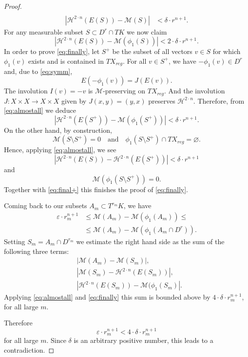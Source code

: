 \documentclass[12pt,leqno,intlimits]{amsart}
\numberwithin{equation}{section}
\theoremstyle{definition}
\theoremstyle{remark}
\def\:{\colon}
\def\emptyset{\varnothing}
\begin{document}
\begin{proof}
\begin{equation}
\begin{aligned}
\\
|\mathcal H^{2\cdot n} (E(S)) - \mathcal M (S)| &< \delta{\cdot}r^{n+1}.
\end{aligned}
\end{equation}
For any measurable subset $S\subset D^r \cap TK$ we now claim
\begin{equation} \label{eq:finally}
|\mathcal H^{2\cdot n} (E(S)) - \mathcal M (\phi _1 (S))| < 2{\cdot}\delta{\cdot}r^{n+1}.
\end{equation}
In order to prove \eqref{eq:finally}, let $S^+$ be the subset of all vectors $v\in S $ for which $\phi_1 (v)$ exists and is contained in $TX_{reg}$.
For all $v\in S^+$, we have $-\phi _1 (v) \in D^r$ and, due to \eqref{eq:symm},
$$E(-\phi_1 (v)) =J(E(v)).$$
The involution $I(v)=-v$ is $\mathcal M$-preserving on $TX_{reg}$. And the involution
$J\:X\times X\to X\times X$ given by $J(x,y)=(y,x)$ preserves $\mathcal H^{2\cdot n}$. Therefore, from \eqref{eq:almostall} we deduce
\begin{equation} \label{eq:final+}
|\mathcal H^{2\cdot n} (E(S^+)) - \mathcal M (\phi _1 (S^+))| < \delta{\cdot}r^{n+1}.
\end{equation}
On the other hand, by construction,
$$ \mathcal M (S\setminus S^+ )=0
\quad\text{and}\quad
\phi _1 (S\setminus S^+)\cap TX_{reg} =\emptyset.$$
Hence, applying \eqref{eq:almostall}, we see
\[
|\mathcal H^{2\cdot n} (E(S))- \mathcal H^{2\cdot n} (E(S^+))|< \delta{\cdot}r^{n+1}\]
and
\[\mathcal M (\phi _1 (S\setminus S^+)) =0.\]
Together with \eqref{eq:final+} this finishes the proof of \eqref{eq:finally}.

Coming back to our subsets $A_m\subset T^{r_m} K$, we have
\begin{align*}
\varepsilon \cdot r_m^ {n+1} &\leq \mathcal M ( A_m) - \mathcal M( \phi _1 (A_m)) \leq
\\
&\leq\mathcal M ( A_m) - \mathcal M( \phi _1 (A_m\cap D^r)).
\end{align*}
Setting $S_m=A_m\cap D^{r_m}$ we estimate the right hand side as the sum of the following three terms:
\begin{align*}
&|\mathcal M (A_m) - \mathcal M(S_m)|,
\\
&|\mathcal M (S_m ) - \mathcal H^{2\cdot n} (E(S_m) )|,
\\
&| \mathcal H ^{2\cdot n} (E(S_m)) - \mathcal M (\phi _1(S_m)|.
\end{align*}
Applying \eqref{eq:almostall} and \eqref{eq:finally} this sum is bounded above by $4{\cdot}\delta{\cdot} r _m^{n+1}$, for all large $m$.

Therefore
\[\varepsilon \cdot r_m^ {n+1}< 4{\cdot} \delta{\cdot} r _m^{n+1}\]
for all large $m$.
Since $\delta$ is an arbitrary positive number, this leads to a contradiction.
\end{proof}
\end{document}
